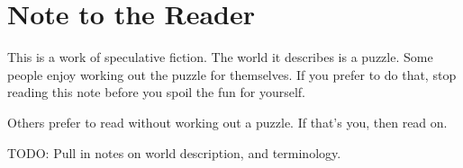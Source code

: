 % 
% 

\chapter*{Note to the Reader}

This is a work of speculative fiction. The world it describes is a puzzle. Some people enjoy working out the puzzle for themselves. If you prefer to do that, stop reading this note before you spoil the fun for yourself.

Others prefer to read without working out a puzzle. If that's you, then read on.

TODO: Pull in notes on world description, and terminology.


\newpage
\thispagestyle{empty}
